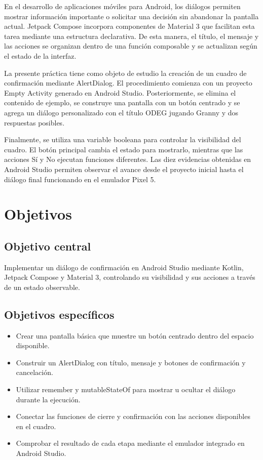 \documentclass[12pt,a4paper]{article}
\begin{document}
En el desarrollo de aplicaciones móviles para Android, los diálogos permiten mostrar información importante o solicitar una decisión sin abandonar la pantalla actual. Jetpack Compose incorpora componentes de Material 3 que facilitan esta tarea mediante una estructura declarativa. De esta manera, el título, el mensaje y las acciones se organizan dentro de una función composable y se actualizan según el estado de la interfaz.

La presente práctica tiene como objeto de estudio la creación de un cuadro de confirmación mediante AlertDialog. El procedimiento comienza con un proyecto Empty Activity generado en Android Studio. Posteriormente, se elimina el contenido de ejemplo, se construye una pantalla con un botón centrado y se agrega un diálogo personalizado con el título ODEG jugando Granny y dos respuestas posibles.

Finalmente, se utiliza una variable booleana para controlar la visibilidad del cuadro. El botón principal cambia el estado para mostrarlo, mientras que las acciones Sí y No ejecutan funciones diferentes. Las diez evidencias obtenidas en Android Studio permiten observar el avance desde el proyecto inicial hasta el diálogo final funcionando en el emulador Pixel 5.

\section{Objetivos}

\subsection{Objetivo central}

Implementar un diálogo de confirmación en Android Studio mediante Kotlin, Jetpack Compose y Material 3, controlando su visibilidad y sus acciones a través de un estado observable.

\subsection{Objetivos específicos}

\begin{itemize}[leftmargin=1.2cm]
  \item Crear una pantalla básica que muestre un botón centrado dentro del espacio disponible.
  \item Construir un AlertDialog con título, mensaje y botones de confirmación y cancelación.
  \item Utilizar remember y mutableStateOf para mostrar u ocultar el diálogo durante la ejecución.
  \item Conectar las funciones de cierre y confirmación con las acciones disponibles en el cuadro.
  \item Comprobar el resultado de cada etapa mediante el emulador integrado en Android Studio.
\end{itemize}
\end{document}
